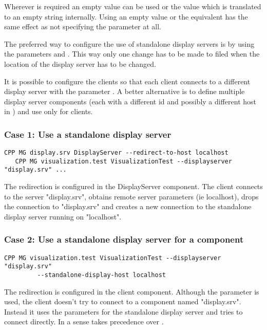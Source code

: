 Wherever  is required an empty value can be used or the value
 which is translated to an empty string internally. Using an empty
value or the equivalent  has the same effect as not specifying the
parameter at all.

The preferred way to configure the use of standalone display servers is by
using the parameters  and . This way only one change has to be made to  filed when
the location of the display server has to be changed.

It is possible to configure the clients so that each client connects to a
different display server with the parameter . A better alternative is to define multiple display server
components (each with a different id and possibly a different host in
) and use only  for clients.

\subsubsection*{Case 1: Use a standalone display server}

\begin{Verbatim}[fontsize=\scriptsize,gobble=3]
   CPP MG display.srv DisplayServer --redirect-to-host localhost
   CPP MG visualization.test VisualizationTest --displayserver "display.srv" ...
\end{Verbatim}

The redirection is configured in the DisplayServer component. The client
connects to the server "display.srv", obtains remote server parameters (ie
localhost), drops the connection to "display.srv" and creates a new connection
to the standalone display server running on "localhost".

\subsubsection*{Case 2: Use a standalone display server for a component}

\begin{Verbatim}[fontsize=\scriptsize,gobble=3]
   CPP MG visualization.test VisualizationTest --displayserver "display.srv"
         --standalone-display-host localhost
\end{Verbatim}

The redirection is configured in the client component. Although the parameter
 is used, the client doesn't try to connect to a
component named "display.srv". Instead it uses the parameters for the
standalone display server and tries to connect directly. In a sense
 takes precedence over
.

